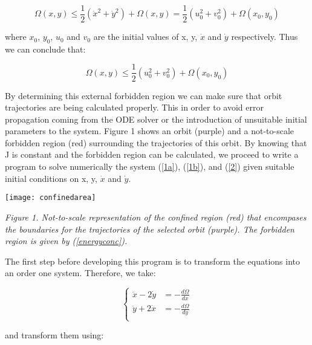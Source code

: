 \documentclass{article}
\begin{document}
\begin{equation}\label{energy}
\Omega(x,y) \leq \frac{1}{2} (\dot{x}^2 + \dot{y}^2) + \Omega(x,y) = \frac{1}{2} (u_0^2 + v_0^2) + \Omega(x_0,y_0)
\end{equation}

where $x_0$, $y_0$, $u_0$ and $v_0$ are the initial values of x, y, $\dot{x}$ and $\dot{y}$ respectively. Thus we can conclude that:

\begin{equation}\label{energyconc}
\Omega(x,y) \leq \frac{1}{2} (u_0^2 + v_0^2) + \Omega(x_0,y_0)
\end{equation}

By determining this external forbidden region we can make sure that orbit trajectories are being calculated properly. This in order to avoid error propagation coming from the ODE solver or the introduction of unsuitable initial parameters to the system. Figure 1 shows an orbit (purple) and a not-to-scale forbidden region (red) surrounding the trajectories of this orbit. By knowing that J is constant and the forbidden region can be calculated, we proceed to write a program to solve numerically the system (\ref{1a}), (\ref{1b}), and (\ref{2}) given suitable initial conditions on x, y, $\dot{x}$ and $\dot{y}$.

\begin{center}
  \texttt{[image: confinedarea]}
\end{center}

\begin{center}
   \textit{Figure 1. Not-to-scale representation of the confined region (red) that encompases the boundaries for the trajectories of the selected orbit (purple). The forbidden region is given by (\ref{energyconc}).}
\end{center}

The first step before developing this program is to transform the equations into an order one system. Therefore, we take:

\begin{equation}\label{transform1}
        \begin{cases}
            \ddot{x} - 2 \dot{y} & = - \frac{d \Omega}{dx} \\
            \ddot{y} + 2 \dot{x} & = - \frac{d \Omega}{dy} \\                
        \end{cases}
\end{equation}

and transform them using:
\end{document}
